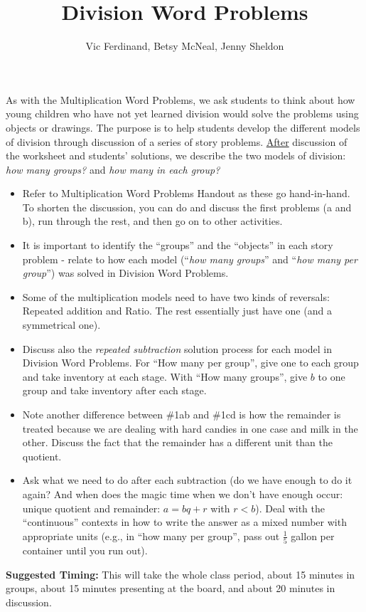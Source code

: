 \documentclass{ximera}
\title{Division Word Problems}
\author{Vic Ferdinand, Betsy McNeal, Jenny Sheldon}
\begin{document}
\begin{abstract} \end{abstract}
\maketitle

\begin{instructorIntro}
As with the Multiplication Word Problems, we ask students to think about how young children who have not yet learned division would solve the problems using objects or drawings.  The purpose is to help students develop the different models of division through discussion of a series of story problems.  \underline{After} discussion of the worksheet and students' solutions, we describe the two models of division: {\em how many groups?} and {\em how many in each group? }

\begin{itemize}
	\item Refer to Multiplication Word Problems Handout as these go hand-in-hand.  To shorten the discussion, you can do and discuss the first problems (a and b), run through the rest, and then go on to other activities.
	\item It is important to identify the ``groups'' and the ``objects'' in each story problem - relate to how each model (``{\em how many groups}'' and ``{\em how many per group}'') was solved in Division Word Problems.
	\item Some of the multiplication models need to have two kinds of reversals:  Repeated addition and Ratio.  The rest essentially just have one (and a symmetrical one).  
	\item Discuss also the {\em repeated subtraction} solution process for each model in Division Word Problems.  For ``How many per group'', give one to each group and take inventory at each stage.  With ``How many groups'', give $b$ to one group and take inventory after each stage.
	\item Note another difference between \#1ab and \#1cd is how the remainder is treated because we are dealing with hard candies in one case and milk in the other.  Discuss the fact that the remainder has a different unit than the quotient.  
	\item Ask what we need to do after each subtraction (do we have enough to do it again? And when does the magic time when we don't have enough occur:  unique quotient and remainder:  $a = bq + r$ with $r < b$).  Deal with the ``continuous'' contexts in how to write the answer as a mixed number with appropriate units (e.g., in ``how many per group'', pass out $\frac15$ gallon per container until you run out). 
\end{itemize}



{\bf Suggested Timing:} This will take the whole class period, about 15 minutes in groups, about 15 minutes presenting at the board, and about 20 minutes in discussion.
\end{instructorIntro}
\end{document}
